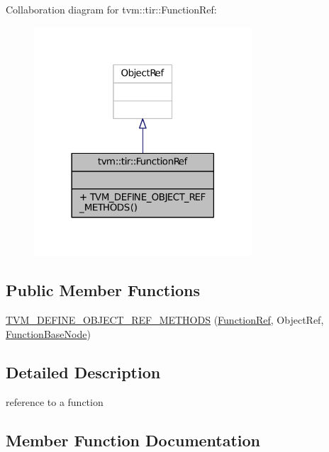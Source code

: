 Collaboration diagram for tvm\+:\+:tir\+:\+:Function\+Ref\+:
\nopagebreak
\begin{figure}[H]
\begin{center}
\leavevmode
\includegraphics[width=230pt]{classtvm_1_1tir_1_1FunctionRef__coll__graph}
\end{center}
\end{figure}
\subsection*{Public Member Functions}
\begin{DoxyCompactItemize}
\item 
\hyperlink{classtvm_1_1tir_1_1FunctionRef_a273924d56febd3c08f493584e4cf7b40}{T\+V\+M\+\_\+\+D\+E\+F\+I\+N\+E\+\_\+\+O\+B\+J\+E\+C\+T\+\_\+\+R\+E\+F\+\_\+\+M\+E\+T\+H\+O\+DS} (\hyperlink{classtvm_1_1tir_1_1FunctionRef}{Function\+Ref}, Object\+Ref, \hyperlink{classtvm_1_1tir_1_1FunctionBaseNode}{Function\+Base\+Node})
\end{DoxyCompactItemize}


\subsection{Detailed Description}
reference to a function 

\subsection{Member Function Documentation}
